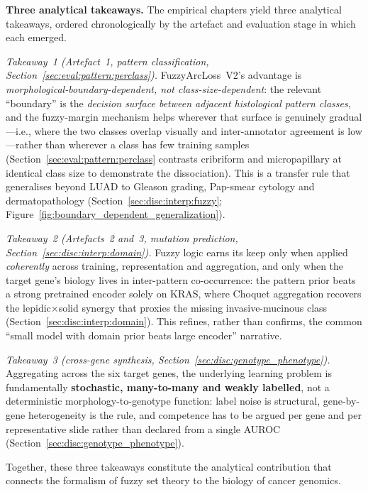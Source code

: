 \textbf{Three analytical takeaways.}
The empirical chapters yield three analytical takeaways, ordered
chronologically by the artefact and evaluation stage in which each
emerged.

\emph{Takeaway~1 (Artefact~1, pattern classification,
Section~\ref{sec:eval:pattern:perclass}).}
FuzzyArcLoss~V2's advantage is
\emph{morphological-boundary-dependent, not
class-size-dependent}: the relevant ``boundary'' is the
\emph{decision surface between adjacent histological pattern
classes}, and the fuzzy-margin mechanism helps wherever that
surface is genuinely gradual---i.e., where the two classes
overlap visually and inter-annotator agreement is low---rather
than wherever a class has few training samples
(Section~\ref{sec:eval:pattern:perclass} contrasts cribriform and
micropapillary at identical class size to demonstrate the
dissociation).
This is a transfer rule that generalises beyond LUAD to Gleason
grading, Pap-smear cytology and dermatopathology
(Section~\ref{sec:disc:interp:fuzzy};
Figure~\ref{fig:boundary_dependent_generalization}).

\emph{Takeaway~2 (Artefacts~2 and~3, mutation prediction,
Section~\ref{sec:disc:interp:domain}).}
Fuzzy logic earns its keep only when applied \emph{coherently}
across training, representation and aggregation, and only when
the target gene's biology lives in inter-pattern co-occurrence:
the pattern prior beats a strong pretrained encoder solely on
KRAS, where Choquet aggregation recovers the
lepidic$\times$solid synergy that proxies the missing
invasive-mucinous class
(Section~\ref{sec:disc:interp:domain}).
This refines, rather than confirms, the common ``small model
with domain prior beats large encoder'' narrative.

\emph{Takeaway~3 (cross-gene synthesis,
Section~\ref{sec:disc:genotype_phenotype}).}
Aggregating across the six target genes, the underlying learning
problem is fundamentally \textbf{stochastic, many-to-many and
weakly labelled}, not a deterministic morphology-to-genotype
function: label noise is structural, gene-by-gene heterogeneity
is the rule, and competence has to be argued per gene and per
representative slide rather than declared from a single AUROC
(Section~\ref{sec:disc:genotype_phenotype}).

Together, these three takeaways constitute the analytical
contribution that connects the formalism of fuzzy set theory to
the biology of cancer genomics.

